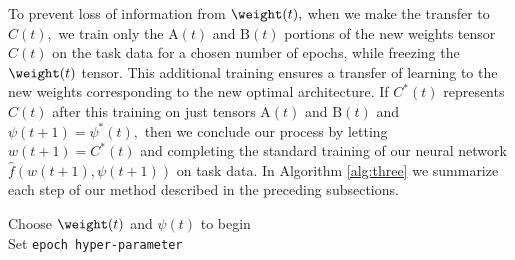  To prevent loss of information from $\weight(t),$ when we make the transfer to $C(t),$ we  train only the $\mathrm{A}(t)$ and $\mathrm{B}(t)$ portions of the new weights tensor $C(t)$ on the task data for a chosen number of epochs, while freezing the $\weight(t)$ tensor. This additional training ensures a transfer of learning to the new weights corresponding to the new optimal architecture. If $C^*(t)$ represents $C(t)$ after this training on just tensors $\mathrm{A}(t)$ and $\mathrm{B}(t)$ and $\psi(t+1) = \psi^*(t),$ then we conclude our process by letting $w(t+1) = C^*(t)$ and completing the standard training of our neural network $\hat{f}(w(t+1),\psi(t+1))$ on task data. In Algorithm \ref{alg:three} we summarize each step of our method described in the preceding subsections.
 
\begin{algorithm}
\caption{Main Training Loop}\label{alg:three}
Choose $\weight(t)$ and $\psi(t)$ to begin\\
Set \texttt{epoch hyper-parameter}\\
\end{algorithm}


